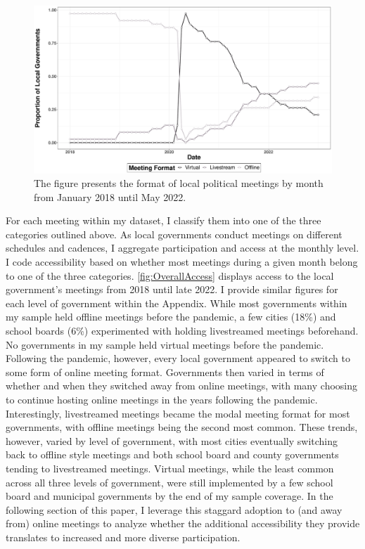     \begin{figure}[H]
        \centering
         \par\medskip
        \includegraphics[scale=0.41]{Figures/OverallAccess.pdf}
        \caption[Public Meeting Formats Overtime]{The figure presents the format of local political meetings by month from January 2018 until May 2022.}
        \label{fig:OverallAccess}
    \end{figure}

    For each meeting within my dataset, I classify them into one of the three categories outlined above. As local governments conduct meetings on different schedules and cadences, I aggregate participation and access at the monthly level. I code accessibility based on whether most meetings during a given month belong to one of the three categories. \autoref{fig:OverallAccess} displays access to the local government’s meetings from 2018 until late 2022. I provide similar figures for each level of government within the Appendix. While most governments within my sample held offline meetings before the pandemic, a few cities (18\%) and school boards (6\%) experimented with holding livestreamed meetings beforehand. No governments in my sample held virtual meetings before the pandemic. Following the pandemic, however, every local government appeared to switch to some form of online meeting format. Governments then varied in terms of whether and when they switched away from online meetings, with many choosing to continue hosting online meetings in the years following the pandemic. Interestingly, livestreamed meetings became the modal meeting format for most governments, with offline meetings being the second most common. These trends, however, varied by level of government, with most cities eventually switching back to offline style meetings and both school board and county governments tending to livestreamed meetings. Virtual meetings, while the least common across all three levels of government, were still implemented by a few school board and municipal governments by the end of my sample coverage. In the following section of this paper, I leverage this staggard adoption to (and away from) online meetings to analyze whether the additional accessibility they provide translates to increased and more diverse participation.

